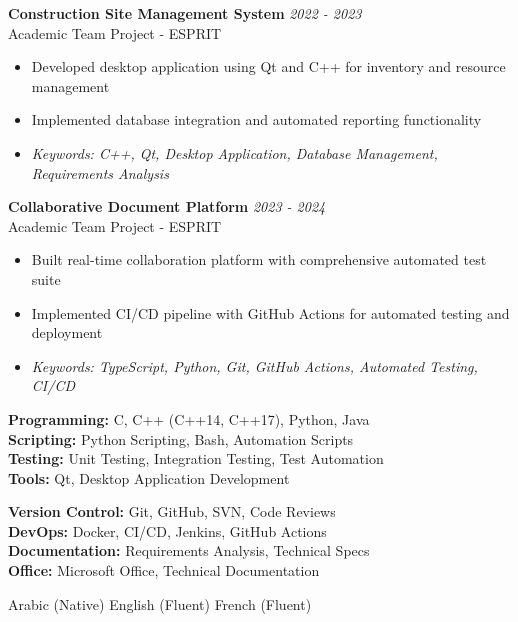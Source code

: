 \documentclass[11pt,a4paper]{article}
\begin{document}

\textbf{Construction Site Management System} \hfill \textit{2022 - 2023}\\[-2pt]
Academic Team Project - ESPRIT\\[-5pt]
\begin{itemize}[leftmargin=8pt,itemsep=1pt,topsep=2pt]
  \item Developed desktop application using Qt and C++ for inventory and resource management
  \item Implemented database integration and automated reporting functionality
  \item[] \textit{\footnotesize Keywords: C++, Qt, Desktop Application, Database Management, Requirements Analysis}
\end{itemize}\vspace{3pt}

\textbf{Collaborative Document Platform} \hfill \textit{2023 - 2024}\\[-2pt]
Academic Team Project - ESPRIT\\[-5pt]
\begin{itemize}[leftmargin=8pt,itemsep=1pt,topsep=2pt]
  \item Built real-time collaboration platform with comprehensive automated test suite
  \item Implemented CI/CD pipeline with GitHub Actions for automated testing and deployment
  \item[] \textit{\footnotesize Keywords: TypeScript, Python, Git, GitHub Actions, Automated Testing, CI/CD}
\end{itemize}\vspace{3pt}

{\small
\begin{minipage}[t]{0.48\textwidth}
  \textbf{Programming:} C, C++ (C++14, C++17), Python, Java\\[1.5pt]
  \textbf{Scripting:} Python Scripting, Bash, Automation Scripts\\[1.5pt]
  \textbf{Testing:} Unit Testing, Integration Testing, Test Automation\\[1.5pt]
  \textbf{Tools:} Qt, Desktop Application Development
\end{minipage}
\hfill
\begin{minipage}[t]{0.48\textwidth}
  \textbf{Version Control:} Git, GitHub, SVN, Code Reviews\\[1.5pt]
  \textbf{DevOps:} Docker, CI/CD, Jenkins, GitHub Actions\\[1.5pt]
  \textbf{Documentation:} Requirements Analysis, Technical Specs\\[1.5pt]
  \textbf{Office:} Microsoft Office, Technical Documentation
\end{minipage}
}

Arabic (Native) \textbar{} English (Fluent) \textbar{} French (Fluent)
\end{document}
